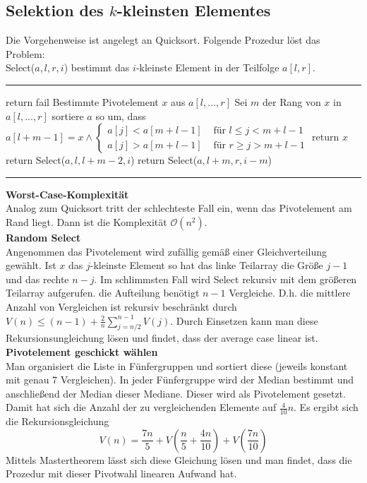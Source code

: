 \documentclass[a4paper, 12pt]{article}
\begin{document}
	\subsection{Selektion des $k$-kleinsten Elementes}
	Die Vorgehenweise ist angelegt an Quicksort. Folgende Prozedur löst das Problem:\\
	Select($a,l,r,i$) bestimmt das $i$-kleinste Element in der Teilfolge $a[l,r]$.\\
	\par\noindent\rule{\textwidth}{0.4pt}
	\begin{algorithmic}
		\State return fail
		\EndIf
		\State Bestimmte Pivotelement $x$ aus $a[l,...,r]$
		\State Sei $m$ der Rang von $x$ in $a[l,...,r]$
		\State sortiere $a$ so um, dass $a[l+m-1]=x \land \begin{cases}
			a[j] < a[m+l-1] & \text{ für } l\leq j<m+l-1\\
			a[j] > a[m+l-1] & \text{ für } r \geq j >m+l-1 
		\end{cases}$
	\State return $x$
	\EndIf
	\State return Select($a,l,l+m-2,i$)
	\EndIf
	\State return Select($a,l+m,r,i-m$)
	\EndIf
	\end{algorithmic}
	\par\noindent\rule{\textwidth}{0.4pt}
	\textbf{Worst-Case-Komplexität}\\
	Analog zum Quicksort tritt der schlechteste Fall ein, wenn das Pivotelement am Rand liegt. Dann ist die Komplexität $\mathcal{O}(n^2)$.\\
	\textbf{Random Select}\\
	Angenommen das Pivotelement wird zufällig gemäß einer Gleichverteilung gewählt. Ist $x$ das $j$-kleinste Element so hat das linke Teilarray die Größe $j-1$ und das rechte $n-j$. Im schlimmsten Fall wird Select rekursiv mit dem größeren Teilarray aufgerufen. die Aufteilung benötigt $n-1$ Vergleiche. D.h. die mittlere Anzahl von Vergleichen ist rekursiv beschränkt durch $V(n) \leq (n-1) + \frac{2}{n} \sum_{j = n/2}^{n-1} V(j)$. Durch Einsetzen kann man diese Rekursionsungleichung lösen und findet, dass der average case linear ist.\\
	\textbf{Pivotelement geschickt wählen}\\
	Man organisiert die Liste in Fünfergruppen und sortiert diese (jeweils konstant mit genau 7 Vergleichen). In jeder Fünfergruppe wird der Median bestimmt und anschließend der Median dieser Mediane. Dieser wird als Pivotelement gesetzt. Damit hat sich die Anzahl der zu vergleichenden Elemente auf $\frac{4}{10}n$. Es ergibt sich die Rekursionsgleichung \[V(n) = \frac{7n}{5} + V(\frac{n}{5} + \frac{4n}{10}) + V(\frac{7n}{10})\] Mittels Mastertheorem lässt sich diese Gleichung lösen und man findet, dass die Prozedur mit dieser Pivotwahl linearen Aufwand hat.
\end{document}
